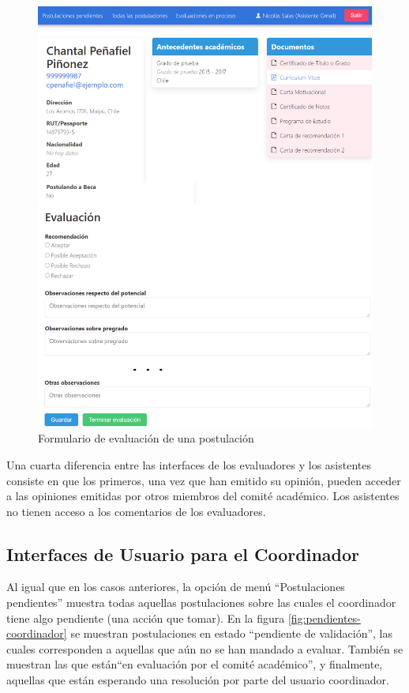 \begin{figure}[!ht]
    \begin{center}
        \includegraphics[scale=0.33]{imagenes/04-formulario-evaluacion.png}
    \end{center}
    \caption{Formulario de evaluación de una postulación}
    \label{fig:formulario-evaluacion}
\end{figure}

Una cuarta diferencia entre las interfaces de los evaluadores y los asistentes
consiste en que los primeros, una vez que han emitido su opinión, pueden acceder
a las opiniones emitidas por otros miembros del comité académico. Los asistentes
no tienen acceso a los comentarios de los evaluadores.

\subsection{Interfaces de Usuario para el Coordinador}

Al igual que en los casos anteriores, la opción de menú “Postulaciones
pendientes” muestra todas aquellas postulaciones sobre las cuales el coordinador
tiene algo pendiente (una acción que tomar). En la figura
\ref{fig:pendientes-coordinador} se muestran postulaciones en estado “pendiente
de validación”, las cuales corresponden a aquellas que aún no se han mandado a
evaluar. También se muestran las que están“en evaluación por el comité
académico”, y finalmente, aquellas que están esperando una resolución por parte
del usuario coordinador.

